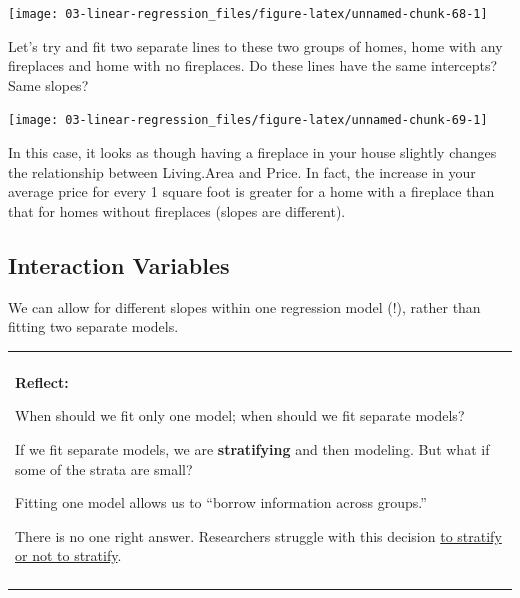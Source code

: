 \documentclass[
]{book}
\newenvironment{Shaded}{\begin{snugshade}}{\end{snugshade}}
\newcommand{\DataTypeTok}[1]{\textcolor[rgb]{0.13,0.29,0.53}{#1}}
\newcommand{\KeywordTok}[1]{\textcolor[rgb]{0.13,0.29,0.53}{\textbf{#1}}}
\newcommand{\NormalTok}[1]{#1}
\newcommand{\OperatorTok}[1]{\textcolor[rgb]{0.81,0.36,0.00}{\textbf{#1}}}
\newcommand{\OtherTok}[1]{\textcolor[rgb]{0.56,0.35,0.01}{#1}}
\newcommand{\StringTok}[1]{\textcolor[rgb]{0.31,0.60,0.02}{#1}}
\newenvironment{reflect}
{
    \begin{center}
    
    \begin{tabular}{|p{0.8\textwidth}|}
    \rowcolor{LightBlue}
    \hline\\
    \rowcolor{LightBlue}
    \textbf{Reflect:}
}
{
    \\\rowcolor{LightBlue}
    \\\hline
    \end{tabular} 
    \end{center}
}
\begin{document}
\begin{center}\texttt{[image: 03-linear-regression\_files/figure-latex/unnamed-chunk-68-1]} \end{center}

Let's try and fit two separate lines to these two groups of homes, home with any fireplaces and home with no fireplaces. Do these lines have the same intercepts? Same slopes?

\begin{Shaded}
\end{Shaded}

\begin{center}\texttt{[image: 03-linear-regression\_files/figure-latex/unnamed-chunk-69-1]} \end{center}

In this case, it looks as though having a fireplace in your house slightly changes the relationship between Living.Area and Price. In fact, the increase in your average price for every 1 square foot is greater for a home with a fireplace than that for homes without fireplaces (slopes are different).

\hypertarget{interaction-variables}{%
\subsection{Interaction Variables}\label{interaction-variables}}

We can allow for different slopes within one regression model (!), rather than fitting two separate models.

\begin{reflect}
When should we fit only one model; when should we fit separate models?

If we fit separate models, we are \textbf{stratifying} and then
modeling. But what if some of the strata are small?

Fitting one model allows us to ``borrow information across groups.''

There is no one right answer. Researchers struggle with this decision
\href{https://www.ncbi.nlm.nih.gov/pubmed/22125224}{to stratify or not
to stratify}.
\end{reflect}
\end{document}
